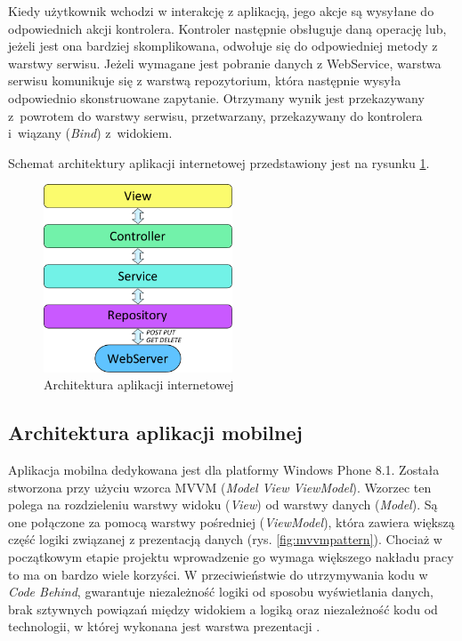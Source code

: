 \documentclass[a4paper]{book}
\begin{document}
			Kiedy użytkownik wchodzi w interakcję z aplikacją, jego akcje są wysyłane do odpowiednich akcji kontrolera. Kontroler następnie obsługuje daną operację lub, jeżeli jest ona bardziej skomplikowana, odwołuje się do odpowiedniej metody z warstwy serwisu. Jeżeli wymagane jest pobranie danych z WebService, warstwa serwisu komunikuje się z warstwą repozytorium, która następnie wysyła odpowiednio skonstruowane zapytanie. Otrzymany wynik jest przekazywany z~powrotem do warstwy serwisu, przetwarzany, przekazywany do kontrolera i~wiązany (\emph{Bind}) z~widokiem.								

			Schemat architektury aplikacji internetowej przedstawiony jest na rysunku \ref{fig:architektura_webapp}.	
			
			\begin{figure}
				\centering
				\includegraphics[width=0.5\textwidth]{images/architektura_webapp.pdf}
				\caption{Architektura aplikacji internetowej}
				\label{fig:architektura_webapp}
    		\end{figure}		
			
			\subsection{Architektura aplikacji mobilnej}
			\label{id:subsec:architektura_aplikacji_mobilnej}	
			
			
			Aplikacja mobilna dedykowana jest dla platformy Windows Phone 8.1. Została stworzona przy użyciu wzorca MVVM (\emph{Model View ViewModel}). Wzorzec ten polega na rozdzieleniu warstwy widoku (\emph{View}) od warstwy danych (\emph{Model}). Są one połączone za pomocą warstwy pośredniej (\emph{ViewModel}), która zawiera większą część logiki związanej z prezentacją danych (rys. \ref{fig:mvvmpattern}). Chociaż w początkowym etapie projektu wprowadzenie go wymaga większego nakładu pracy to ma on bardzo wiele korzyści. W przeciwieństwie do utrzymywania kodu w \emph{Code Behind}, gwarantuje niezależność logiki od sposobu wyświetlania danych, brak sztywnych powiązań między widokiem a logiką oraz niezależność kodu od technologii, w której wykonana jest warstwa prezentacji \cite{id:MVVM}.
			
\end{document}
